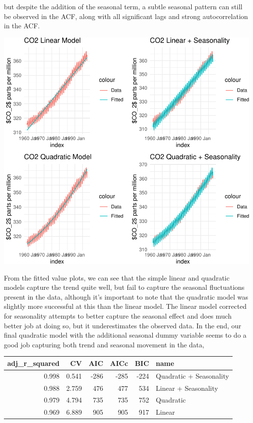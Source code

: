 \documentclass[AER]{AEA}
\begin{document}
but despite the addition of the seasonal term, a subtle seasonal pattern
can still be observed in the ACF, along with all significant lags and
strong autocorrelation in the ACF.

\includegraphics{co2_1997_Qian_files/figure-latex/unnamed-chunk-1-1.pdf}

From the fitted value plots, we can see that the simple linear and
quadratic models capture the trend quite well, but fail to capture the
seasonal fluctuations present in the data, although it's important to
note that the quadratic model was slightly more successful at this than
the linear model. The linear model corrected for seasonality attempts to
better capture the seasonal effect and does much better job at doing so,
but it underestimates the observed data. In the end, our final quadratic
model with the additional seasonal dummy variable seems to do a good job
capturing both trend and seasonal movement in the data,

\begin{longtable}[]{@{}rrrrrl@{}}
\toprule
adj\_r\_squared & CV & AIC & AICc & BIC & name \\
\midrule
\endhead
0.998 & 0.541 & -286 & -285 & -224 & Quadratic + Seasonality \\
0.988 & 2.759 & 476 & 477 & 534 & Linear + Seasonality \\
0.979 & 4.794 & 735 & 735 & 752 & Quadratic \\
0.969 & 6.889 & 905 & 905 & 917 & Linear \\
\bottomrule
\end{longtable}
\end{document}
